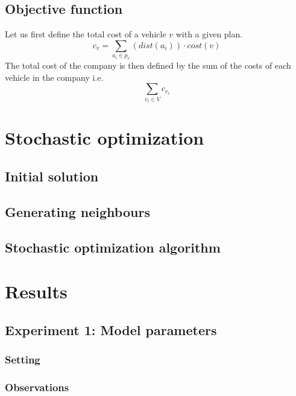 \documentclass[11pt]{article}
\begin{document}
\subsection{Objective function}
Let us first define the total cost of a vehicle $v$ with a given plan. $$c_v =
\sum_{a_i \in p_v} (dist(a_i))\cdot cost(v)$$
The total cost of the company is then defined by the sum of the costs of each
vehicle in the company i.e.
$$\sum_{v_i \in V} c_{v_i}$$

\section{Stochastic optimization}

\subsection{Initial solution}

\subsection{Generating neighbours}

\subsection{Stochastic optimization algorithm}


\section{Results}

\subsection{Experiment 1: Model parameters}

\subsubsection{Setting}

\subsubsection{Observations}
\end{document}
